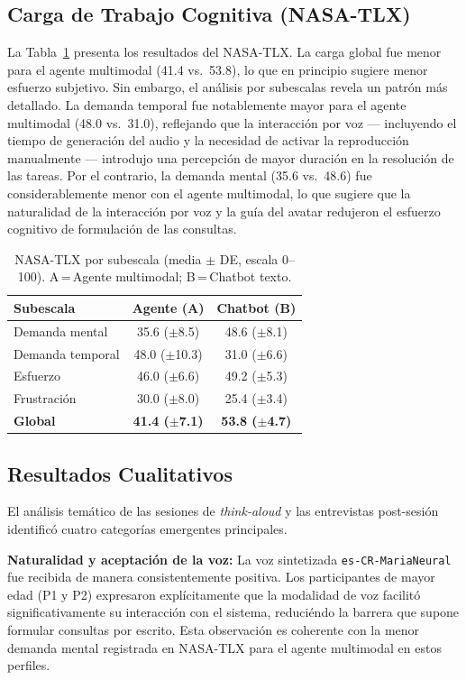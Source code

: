 \documentclass[conference]{IEEEtran}
\begin{document}
\subsection{Carga de Trabajo Cognitiva (NASA-TLX)}
La Tabla~\ref{tab:nasatlx} presenta los resultados del NASA-TLX. La carga global fue menor para el agente multimodal (41.4 vs.~53.8), lo que en principio sugiere menor esfuerzo subjetivo. Sin embargo, el análisis por subescalas revela un patrón más detallado. La demanda temporal fue notablemente mayor para el agente multimodal (48.0 vs.~31.0), reflejando que la interacción por voz --- incluyendo el tiempo de generación del audio y la necesidad de activar la reproducción manualmente --- introdujo una percepción de mayor duración en la resolución de las tareas. Por el contrario, la demanda mental (35.6 vs.~48.6) fue considerablemente menor con el agente multimodal, lo que sugiere que la naturalidad de la interacción por voz y la guía del avatar redujeron el esfuerzo cognitivo de formulación de las consultas.
\begin{table}[htbp]
\caption{NASA-TLX por subescala (media $\pm$ DE, escala 0--100). A\,=\,Agente multimodal; B\,=\,Chatbot texto.}
\label{tab:nasatlx}
\centering
\begin{tabular}{lcc}
\toprule
Subescala & Agente (A) & Chatbot (B) \\
\midrule
Demanda mental    & 35.6 ($\pm$8.5)  & 48.6 ($\pm$8.1) \\
Demanda temporal  & 48.0 ($\pm$10.3) & 31.0 ($\pm$6.6) \\
Esfuerzo          & 46.0 ($\pm$6.6)  & 49.2 ($\pm$5.3) \\
Frustraci\'on     & 30.0 ($\pm$8.0)  & 25.4 ($\pm$3.4) \\
\midrule
\textbf{Global}   & \textbf{41.4 ($\pm$7.1)} & \textbf{53.8 ($\pm$4.7)} \\
\bottomrule
\end{tabular}
\end{table}
\subsection{Resultados Cualitativos}
El análisis temático de las sesiones de \textit{think-aloud} y las entrevistas post-sesión identificó cuatro categorías emergentes principales.

\textbf{Naturalidad y aceptación de la voz:} La voz sintetizada \texttt{es-CR-MariaNeural} fue recibida de manera consistentemente positiva. Los participantes de mayor edad (P1 y P2) expresaron explícitamente que la modalidad de voz facilitó significativamente su interacción con el sistema, reduciéndo la barrera que supone formular consultas por escrito. Esta observación es coherente con la menor demanda mental registrada en NASA-TLX para el agente multimodal en estos perfiles.
\end{document}
